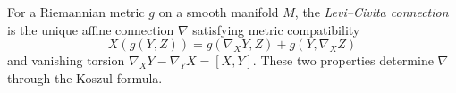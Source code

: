 
For a Riemannian metric $g$ on a smooth manifold $M$, the \emph{Levi--Civita connection} is the unique affine connection $\nabla$ satisfying metric compatibility
\[
X(g(Y,Z))=g(\nabla_XY,Z)+g(Y,\nabla_XZ)
\]
and vanishing torsion $\nabla_XY-\nabla_YX=[X,Y]$. These two properties determine $\nabla$ through the Koszul formula.
